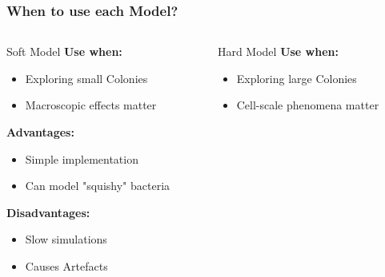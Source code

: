 \documentclass[10pt,t]{beamer}
\begin{document}


\begin{frame}
    \frametitle{When to use each Model?}

    \vspace{-0.55cm}

    \begin{columns}
        \begin{column}{0.5\textwidth}
            \begin{alertblock}{Soft Model}
                \textbf{Use when:}
                \begin{itemize}
                    \item Exploring small Colonies
                    \item Macroscopic effects matter
                \end{itemize}

                \textbf{Advantages:}
                \begin{itemize}
                    \item Simple implementation
                    \item Can model "squishy" bacteria
                \end{itemize}

                \textbf{Disadvantages:}
                \begin{itemize}
                    \item Slow simulations
                    \item Causes Artefacts
                \end{itemize}
            \end{alertblock}
        \end{column}
        \begin{column}{0.5\textwidth}
            \begin{exampleblock}{Hard Model }
                \textbf{Use when:}
                \begin{itemize}
                    \item Exploring large Colonies
                    \item Cell-scale phenomena matter
                \end{itemize}


\end{exampleblock}
\end{column}
\end{columns}
\end{frame}
\end{document}
